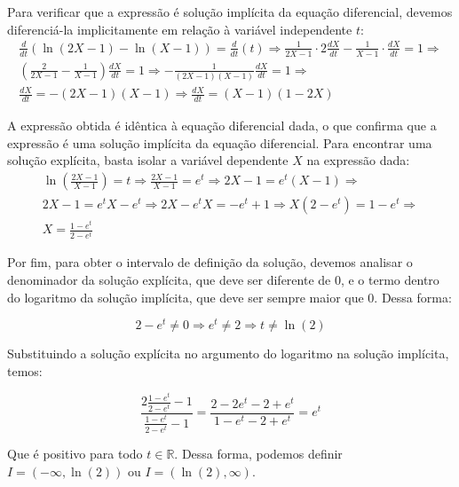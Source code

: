 \documentclass[oneside,12pt,a4paper]{report}
\begin{document}

        \begin{tcolorbox}[enhanced, breakable, colback=blue!1!white,colframe=blue!75!black,title=\textbf{\hyperlink{quest:ex3}{\hypertarget{resp:ex3}{Exercício 3}}}]
        \noindent Para verificar que a expressão é solução implícita da equação diferencial, devemos diferenciá-la implicitamente em relação à variável independente $t$:
        \begin{gather*}
            \frac{d}{dt}\left(\ln(2X-1)-\ln(X-1)\right)=\frac{d}{dt}(t)\Rightarrow
            \frac{1}{2X-1}\cdot 2\frac{dX}{dt} - \frac{1}{X-1}\cdot \frac{dX}{dt} = 1\Rightarrow\\
            \left(\frac{2}{2X-1} - \frac{1}{X-1}\right)\frac{dX}{dt} = 1\Rightarrow
            -\frac{1}{(2X-1)(X-1)}\frac{dX}{dt} = 1\Rightarrow\\
            \frac{dX}{dt} = -(2X-1)(X-1) \Rightarrow \boxed{\frac{dX}{dt} = (X-1)(1-2X)}
        \end{gather*}

        \noindent A expressão obtida é idêntica à equação diferencial dada, o que confirma que a expressão é uma solução implícita da equação diferencial. Para encontrar uma solução explícita, basta isolar a variável dependente $X$ na expressão dada:
        \begin{gather*}
            \ln\left(\frac{2X-1}{X-1}\right)=t\Rightarrow
            \frac{2X-1}{X-1}=e^t\Rightarrow
            2X-1 = e^t(X-1)\Rightarrow\\
            2X-1 = e^tX - e^t\Rightarrow
            2X - e^tX = -e^t + 1\Rightarrow
            X(2 - e^t) = 1 - e^t\Rightarrow\\
            \boxed{X = \frac{1 - e^t}{2 - e^t}}
        \end{gather*}

        \noindent Por fim, para obter o intervalo de definição da solução, devemos analisar o denominador da solução explícita, que deve ser diferente de $0$, e o termo dentro do logaritmo da solução implícita, que deve ser sempre maior que $0$. Dessa forma:

        $$2-e^t \neq 0 \Rightarrow e^t \neq 2 \Rightarrow t \neq \ln(2)$$

        \noindent Substituindo a solução explícita no argumento do logaritmo na solução implícita, temos:

        $$\frac{2\frac{1-e^t}{2-e^t}-1}{\frac{1-e^t}{2-e^t}-1}=\frac{2-2e^t-2+e^t}{1-e^t-2+e^t}=e^t$$

        \noindent Que é positivo para todo $t \in \mathbb{R}$. Dessa forma, podemos definir $I=(-\infty, \ln(2))$ ou $I=(\ln(2), \infty)$.
        
        \end{tcolorbox}
\end{document}
